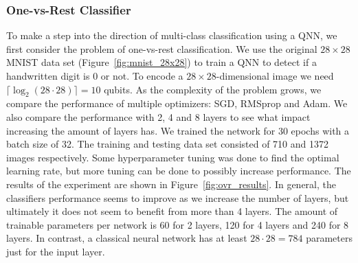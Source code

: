 \documentclass[a4paper,10pt]{article}
\begin{document}
\subsubsection{One-vs-Rest Classifier}
To make a step into the direction of multi-class classification using a QNN, we first consider the problem of one-vs-rest classification.
We use the original $28 \times 28$ MNIST data set (Figure~\ref{fig:mnist_28x28}) to train a QNN to detect if a handwritten digit is 0 or not.
To encode a $28 \times 28$-dimensional image we need $\lceil \log_2(28 \cdot 28) \rceil = 10$ qubits.
As the complexity of the problem grows, we compare the performance of multiple optimizers: SGD, RMSprop and Adam.
We also compare the performance with 2, 4 and 8 layers to see what impact increasing the amount of layers has.
We trained the network for 30 epochs with a batch size of 32.
The training and testing data set consisted of 710 and 1372 images respectively.
Some hyperparameter tuning was done to find the optimal learning rate, but more tuning can be done to possibly increase performance.
The results of the experiment are shown in Figure~\ref{fig:ovr_results}.
In general, the classifiers performance seems to improve as we increase the number of layers, but ultimately it does not seem to benefit from more than 4 layers.
The amount of trainable parameters per network is 60 for 2 layers, 120 for 4 layers and 240 for 8 layers.
In contrast, a classical neural network has at least $28 \cdot 28 = 784$ parameters just for the input layer.
\end{document}
